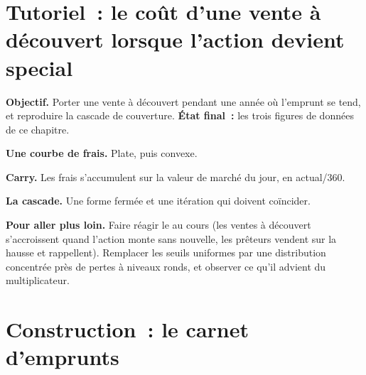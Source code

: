 \section{Tutoriel~: le coût d'une vente à découvert lorsque l'action devient special}\label{tut:m1:stock-loan-and-short-selling:cost}

\begin{tutorial}
\textbf{Objectif.} Porter une vente à découvert pendant une année où l'emprunt se tend, et
reproduire la cascade de couverture. \textbf{État final~:} les trois figures de données
de ce chapitre.
\begin{tutsteps}
\item \textbf{Une courbe de frais.} Plate, puis convexe.
\label{lst:m1:stock-loan-and-short-selling:fee}
\item \textbf{Carry.} Les frais s'accumulent sur la valeur de marché du jour, en actual/360.
\label{lst:m1:stock-loan-and-short-selling:carry}
\item \textbf{La cascade.} Une forme fermée et une itération qui doivent coïncider.
\label{lst:m1:stock-loan-and-short-selling:squeeze}
\end{tutsteps}
\textbf{Pour aller plus loin.} Faire réagir le  au cours (les ventes
à découvert s'accroissent quand l'action monte sans nouvelle, les prêteurs vendent sur la hausse et rappellent).
Remplacer les seuils uniformes par une distribution concentrée près de
pertes à niveaux ronds, et observer ce qu'il advient du multiplicateur.
\end{tutorial}

\section{Construction~: le carnet d'emprunts}\label{bld:m1:stock-loan-and-short-selling:borrow}

